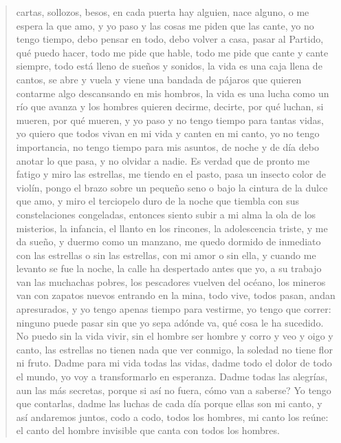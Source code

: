 \documentclass[12pt]{article}
\begin{document}
\begin{verse}
cartas, sollozos, besos,  
en cada puerta  
hay alguien,  
nace alguno,  
o me espera la que amo,  
y yo paso y las cosas  
me piden que las cante,  
yo no tengo tiempo,  
debo pensar en todo,  
debo volver a casa,  
pasar al Partido,  
qué puedo hacer,  
todo me pide  
que hable,  
todo me pide  
que cante y cante siempre,  
todo está lleno  
de sueños y sonidos,  
la vida es una caja  
llena de cantos, se abre  
y vuela y viene  
una bandada  
de pájaros  
que quieren contarme algo  
descansando en mis hombros,  
la vida es una lucha  
como un río que avanza  
y los hombres  
quieren decirme,  
decirte,  
por qué luchan,  
si mueren,  
por qué mueren,  
y yo paso y no tengo  
tiempo para tantas vidas,  
yo quiero  
que todos vivan  
en mi vida  
y canten en mi canto,  
yo no tengo importancia,  
no tengo tiempo  
para mis asuntos,  
de noche y de día  
debo anotar lo que pasa,  
y no olvidar a nadie.  
Es verdad que de pronto  
me fatigo  
y miro las estrellas,  
me tiendo en el pasto, pasa  
un insecto color de violín,  
pongo el brazo  
sobre un pequeño seno  
o bajo la cintura  
de la dulce que amo,  
y miro el terciopelo  
duro  
de la noche que tiembla  
con sus constelaciones congeladas,  
entonces  
siento subir a mi alma  
la ola de los misterios,  
la infancia,  
el llanto en los rincones,  
la adolescencia triste,  
y me da sueño,  
y duermo  
como un manzano,  
me quedo dormido  
de inmediato  
con las estrellas o sin las estrellas,  
con mi amor o sin ella,  
y cuando me levanto  
se fue la noche,  
la calle ha despertado antes que yo,  
a su trabajo  
van las muchachas pobres,  
los pescadores vuelven  
del océano,  
los mineros  
van con zapatos nuevos  
entrando en la mina,  
todo vive,  
todos pasan,  
andan apresurados,  
y yo tengo apenas tiempo  
para vestirme,  
yo tengo que correr:  
ninguno puede  
pasar sin que yo sepa  
adónde va, qué cosa  
le ha sucedido.  
No puedo  
sin la vida vivir,  
sin el hombre ser hombre  
y corro y veo y oigo  
y canto,  
las estrellas no tienen  
nada que ver conmigo,  
la soledad no tiene  
flor ni fruto.  
Dadme para mi vida  
todas las vidas,  
dadme todo el dolor  
de todo el mundo,  
yo voy a transformarlo  
en esperanza.  
Dadme  
todas las alegrías,  
aun las más secretas,  
porque si así no fuera,  
cómo van a saberse?  
Yo tengo que contarlas,  
dadme  
las luchas  
de cada día  
porque ellas son mi canto,  
y así andaremos juntos,  
codo a codo,  
todos los hombres,  
mi canto los reúne:  
el canto del hombre invisible  
que canta con todos los hombres.  

\end{verse}
\end{document}

